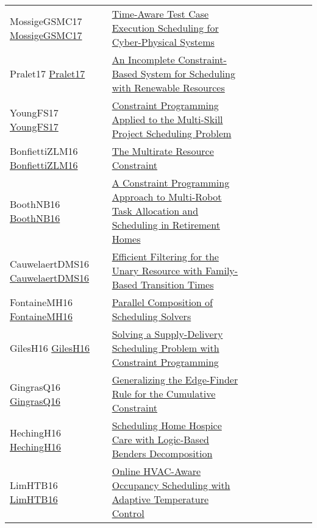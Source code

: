 {\begin{longtable}{p{3cm}p{7cm}lllllll}
MossigeGSMC17 \href{https://doi.org/10.1007/978-3-319-66158-2\_25}{MossigeGSMC17} &  \href{papers/MossigeGSMC17.pdf}{Time-Aware Test Case Execution Scheduling for Cyber-Physical Systems} &  &  &  &  &  &  & \\
Pralet17 \href{https://doi.org/10.1007/978-3-319-66158-2\_16}{Pralet17} &  \href{papers/Pralet17.pdf}{An Incomplete Constraint-Based System for Scheduling with Renewable Resources} &  &  &  &  &  &  & \\
YoungFS17 \href{https://doi.org/10.1007/978-3-319-66158-2\_20}{YoungFS17} &  \href{papers/YoungFS17.pdf}{Constraint Programming Applied to the Multi-Skill Project Scheduling Problem} &  &  &  &  &  &  & \\
BonfiettiZLM16 \href{https://doi.org/10.1007/978-3-319-44953-1\_8}{BonfiettiZLM16} &  \href{papers/BonfiettiZLM16.pdf}{The Multirate Resource Constraint} &  &  &  &  &  &  & \\
BoothNB16 \href{https://doi.org/10.1007/978-3-319-44953-1\_34}{BoothNB16} &  \href{papers/BoothNB16.pdf}{A Constraint Programming Approach to Multi-Robot Task Allocation and Scheduling in Retirement Homes} &  &  &  &  &  &  & \\
CauwelaertDMS16 \href{https://doi.org/10.1007/978-3-319-44953-1\_33}{CauwelaertDMS16} &  \href{papers/CauwelaertDMS16.pdf}{Efficient Filtering for the Unary Resource with Family-Based Transition Times} &  &  &  &  &  &  & \\
FontaineMH16 \href{https://doi.org/10.1007/978-3-319-33954-2\_12}{FontaineMH16} &  \href{papers/FontaineMH16.pdf}{Parallel Composition of Scheduling Solvers} &  &  &  &  &  &  & \\
GilesH16 \href{https://doi.org/10.1007/978-3-319-44953-1\_38}{GilesH16} &  \href{papers/GilesH16.pdf}{Solving a Supply-Delivery Scheduling Problem with Constraint Programming} &  &  &  &  &  &  & \\
GingrasQ16 \href{http://www.ijcai.org/Abstract/16/440}{GingrasQ16} &  \href{}{Generalizing the Edge-Finder Rule for the Cumulative Constraint} &  &  &  &  &  &  & \\
HechingH16 \href{https://doi.org/10.1007/978-3-319-33954-2\_14}{HechingH16} &  \href{papers/HechingH16.pdf}{Scheduling Home Hospice Care with Logic-Based Benders Decomposition} &  &  &  &  &  &  & \\
LimHTB16 \href{https://doi.org/10.1007/978-3-319-44953-1\_43}{LimHTB16} &  \href{papers/LimHTB16.pdf}{Online HVAC-Aware Occupancy Scheduling with Adaptive Temperature Control} &  &  &  &  &  &  & \\

\end{longtable}}

